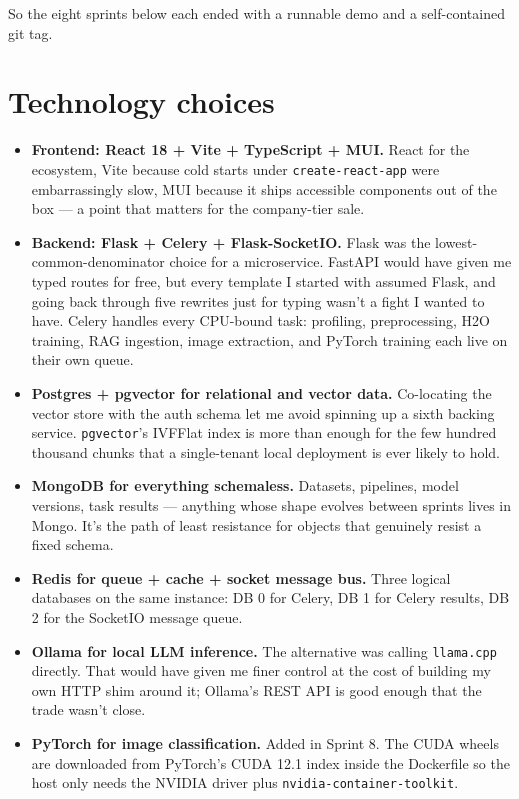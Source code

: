 \documentclass[12pt, a4paper]{report}
\begin{document}
So the eight sprints below each ended with a runnable demo and a
self-contained git tag.

\section{Technology choices}

\begin{itemize}
    \item \textbf{Frontend: React 18 + Vite + TypeScript + MUI.} React
        for the ecosystem, Vite because cold starts under
        \texttt{create-react-app} were embarrassingly slow, MUI because
        it ships accessible components out of the box --- a point that
        matters for the company-tier sale.
    \item \textbf{Backend: Flask + Celery + Flask-SocketIO.} Flask was
        the lowest-common-denominator choice for a microservice. FastAPI
        would have given me typed routes for free, but every template I
        started with assumed Flask, and going back through five
        rewrites just for typing wasn't a fight I wanted to have.
        Celery handles every CPU-bound task: profiling, preprocessing,
        H2O training, RAG ingestion, image extraction, and PyTorch
        training each live on their own queue.
    \item \textbf{Postgres + pgvector for relational and vector data.}
        Co-locating the vector store with the auth schema let me avoid
        spinning up a sixth backing service. \texttt{pgvector}'s
        IVFFlat index is more than enough for the few hundred thousand
        chunks that a single-tenant local deployment is ever likely
        to hold.
    \item \textbf{MongoDB for everything schemaless.} Datasets,
        pipelines, model versions, task results --- anything whose
        shape evolves between sprints lives in Mongo. It's the path of
        least resistance for objects that genuinely resist a fixed
        schema.
    \item \textbf{Redis for queue + cache + socket message bus.} Three
        logical databases on the same instance: DB 0 for Celery, DB 1
        for Celery results, DB 2 for the SocketIO message queue.
    \item \textbf{Ollama for local LLM inference.} The alternative was
        calling \texttt{llama.cpp} directly. That would have given me
        finer control at the cost of building my own HTTP shim around
        it; Ollama's REST API is good enough that the trade wasn't
        close.
    \item \textbf{PyTorch for image classification.} Added in Sprint 8.
        The CUDA wheels are downloaded from PyTorch's CUDA 12.1 index
        inside the Dockerfile so the host only needs the NVIDIA driver
        plus \texttt{nvidia-container-toolkit}.
\end{itemize}
\end{document}
